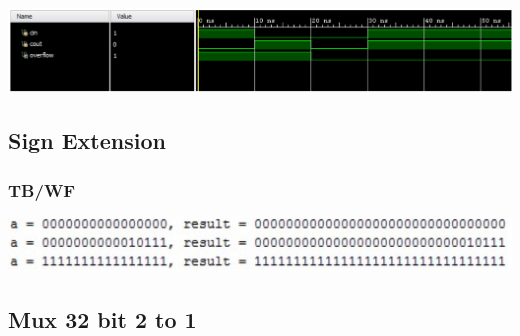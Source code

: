 \documentclass{llncs}
\begin{document}
\includegraphics[scale=.2]{images/overflowWave.png}




\cite{*}




\subsection{Sign Extension}
\label{se:1}
\begin{addmargin}[-5em]{-6em}
  
\end{addmargin}

\subsubsection{TB/WF}
\begin{addmargin}[-5em]{-6em}
  
\end{addmargin}
\includegraphics[scale=.2]{images/signExtension.png}


\subsection{Mux 32 bit 2 to 1}%
\label{m32:1}
\begin{addmargin}[-5em]{-6em}
  
\end{addmargin}
\end{document}
